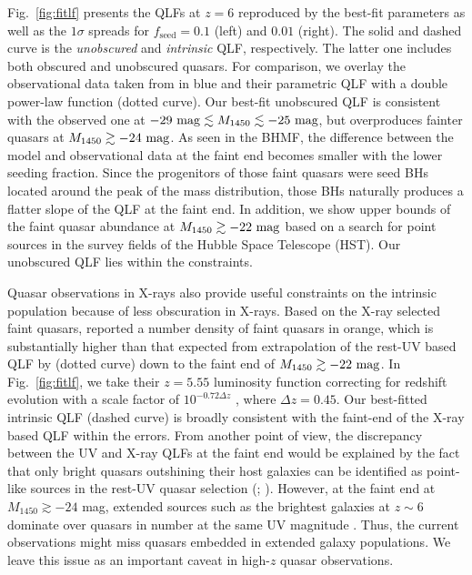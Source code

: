 \documentclass[twocolumn, twocolappendix]{aastex63}
\newcommand{\fseed}{f_\mathrm{seed}}
\newcommand{\Muv}{M_{1450}}
\begin{document}
\begin{CJK*}{UTF8}{gbsn}
Fig.~\ref{fig:fitlf} presents the QLFs at $z=6$ reproduced by the best-fit parameters as well as the $1\sigma$ spreads
for $\fseed = 0.1$ (left) and $0.01$ (right).
The solid and dashed curve is the {\it unobscured} and {\it intrinsic} QLF, respectively.
The latter one includes both obscured and unobscured quasars.
For comparison, we overlay the observational data taken from  in blue
and their parametric QLF with a double power-law function (dotted curve).
Our best-fit unobscured QLF is consistent with the observed one at $-29~{\rm mag} \lesssim \Muv \lesssim -25~{\rm mag}$,
but overproduces fainter quasars at $\Muv\gtrsim -24~{\rm mag}$.
As seen in the BHMF, the difference between the model and observational data at the faint end becomes smaller with
the lower seeding fraction.
Since the progenitors of those faint quasars were seed BHs located around the peak of the mass distribution,
those BHs naturally produces a flatter slope of the QLF at the faint end.
In addition, we show upper bounds of the faint quasar abundance at $\Muv\gtrsim -22~{\rm mag}$ \citep[green;][]{2022NatAs...6..850J}
based on a search for point sources in the survey fields of the Hubble Space Telescope (HST).
Our unobscured QLF lies within the constraints.


Quasar observations in X-rays also provide 
useful constraints on the intrinsic population because of less obscuration in X-rays.
Based on the X-ray selected faint quasars, \cite{2019ApJ...884...19G} reported a number density of 
faint quasars in orange, which is substantially higher than that expected from extrapolation of the rest-UV based QLF by 
 (dotted curve) down to the faint end of $\Muv\gtrsim -22~{\rm mag}$.
In Fig.~\ref{fig:fitlf}, we take their $z=5.55$ luminosity function correcting for redshift evolution 
with a scale factor of $10^{-0.72\Delta z}$ \citep{2016ApJ...833..222J}, where $\Delta z=0.45$.
Our best-fitted intrinsic QLF (dashed curve) is broadly consistent with the faint-end of the X-ray based QLF within the errors.
From another point of view, the discrepancy between the UV and X-ray QLFs at the faint end would be explained by the fact that 
only bright quasars outshining their host galaxies can be identified as point-like sources in the rest-UV quasar selection 
(; \citealt{2020MNRAS.495.2135N,2020MNRAS.494.1771A,2021MNRAS.502.2757O,2021MNRAS.502..662B,2022arXiv220712282K}).
However, at the faint end at $\Muv\gtrsim -24$ mag, extended sources such as the brightest galaxies at $z\sim 6$ 
dominate over quasars in number at the same UV magnitude \citep{2022ApJS..259...20H}.
Thus, the current observations might miss quasars embedded in extended galaxy populations. 
We leave this issue as an important caveat in high-$z$ quasar observations.



\end{CJK*}
\end{document}
